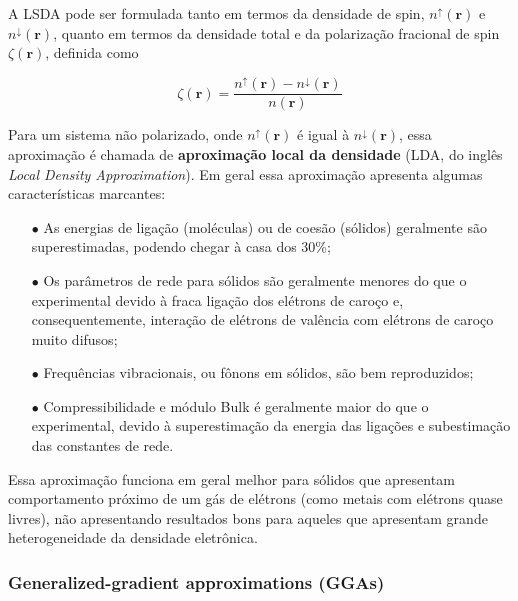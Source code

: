 			A LSDA pode ser formulada tanto em termos da densidade de spin, $n^\uparrow(\textbf{r})$ e $n^\downarrow(\textbf{r})$, quanto em termos da densidade total e da polarização fracional de spin $\zeta(\textbf{r})$, definida como
			
			\begin{equation}
				\zeta({\textbf{r}}) = \frac{n^\uparrow(\textbf{r}) - n^\downarrow(\textbf{r})}{n(\textbf{r})}
			\end{equation}
			
			Para um sistema não polarizado, onde $n^\uparrow(\textbf{r})$ é igual à $n^\downarrow(\textbf{r})$, essa aproximação é chamada de \textbf{aproximação local da densidade} (LDA, do inglês \textit{Local Density Approximation}). Em geral essa aproximação apresenta algumas características marcantes:
			
			\begin{enumerate}
				\item[$\bullet$] As energias de ligação (moléculas) ou de coesão (sólidos) geralmente são superestimadas, podendo chegar à casa dos 30\%;
				
				\item[$\bullet$] Os parâmetros de rede para sólidos são geralmente menores do que o experimental devido à fraca ligação dos elétrons de caroço e, consequentemente, interação de elétrons de valência com elétrons de caroço muito difusos;
				
				\item[$\bullet$] Frequências vibracionais, ou fônons em sólidos, são bem reproduzidos;
				
				\item[$\bullet$] Compressibilidade e módulo Bulk é geralmente maior do que o experimental, devido à superestimação da energia das ligações e subestimação das constantes de rede.
			\end{enumerate}
		
			Essa aproximação funciona em geral melhor para sólidos que apresentam comportamento próximo de um gás de elétrons (como metais com elétrons quase livres), não apresentando resultados bons para aqueles que apresentam grande heterogeneidade da densidade eletrônica. 
			
	\subsubsection{Generalized-gradient approximations (GGAs)}
		
